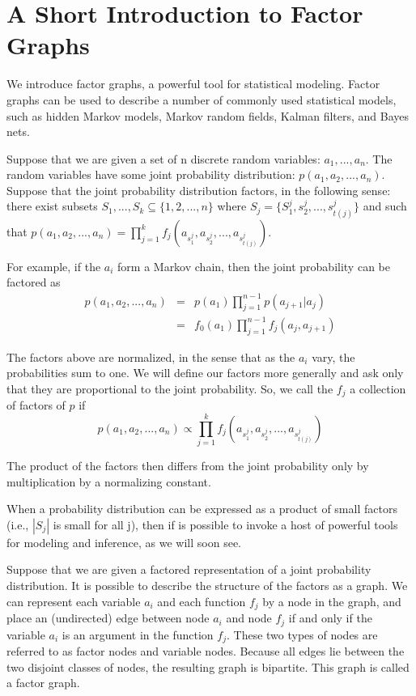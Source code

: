 \section{A Short Introduction to Factor Graphs}
\label{sec:IntroductionToFactorGraphs}

We introduce factor graphs, a powerful tool for statistical modeling.  
Factor graphs can be used to describe a number of commonly used 
statistical models, such as hidden Markov models, Markov random 
fields, Kalman filters, and Bayes nets. 

Suppose that we are given a set of n discrete random variables: $a_1,...,a_n$.  The random variables have some joint probability distribution:  $ p(a_1,a_2,...,a_n) $.  Suppose that the joint probability distribution factors, in the following sense: there exist subsets  $ S_1,...,S_k \subseteq \lbrace 1,2,...,n\rbrace $ where $ S_j = \lbrace S_1^j,s_2^j,...,s_{t(j)}^j \rbrace $ and such that $p(a_1,a_2,...,a_n) = \prod_{j=1}^k f_j(a_{s_1^j},a_{s_2^j},...,a_{s_{t(j)}^j})$.

For example, if the $a_i$ form a Markov chain, then the joint probability can be factored as
%
\begin{eqnarray}
\label{eqn:markovChain}
p(a_1,a_2,...,a_n) &=& p(a_1) \prod_{j=1}^{n-1}p(a_{j+1}|a_j) \\
		   &=& f_0(a_1) \prod_{j=1}^{n-1} f_j(a_j,a_{j+1})
\end{eqnarray}

The factors above are normalized, in the sense that as the $a_i$  vary, 
the probabilities sum to one.  We will define our factors more 
generally and ask only that they are proportional to the joint 
probability.  So, we call the $f_{j}$ a collection of factors of $p$ if 
%
\[
p(a_1,a_2,...,a_n) \propto \prod_{j=1}^k f_j(a_{s_1^j},a_{s_2^j},...,a_{s_{t(j)}^j}) 
\]

The product of the factors then differs from the joint probability only by 
multiplication by a normalizing constant.

When a probability distribution can be expressed as a product of small factors 
(i.e., $|S_j|$ is small for all j), then if is possible to invoke a host of powerful 
tools for modeling and inference, as we will soon see.

Suppose that we are given a factored representation of a joint probability distribution.  
It is possible to describe the structure of the factors as a graph.  We can represent 
each variable $a_i$  and each function $f_j$  by a node in the graph, and place an (undirected) 
edge between node $a_i$  and node $f_j$ if and only if the variable $a_i$  is an argument in the 
function $f_j$.  These two types of nodes are referred to as factor nodes and variable nodes. 
Because all edges lie between the two disjoint classes of nodes, the resulting graph is bipartite.  
This graph is called a factor graph.

